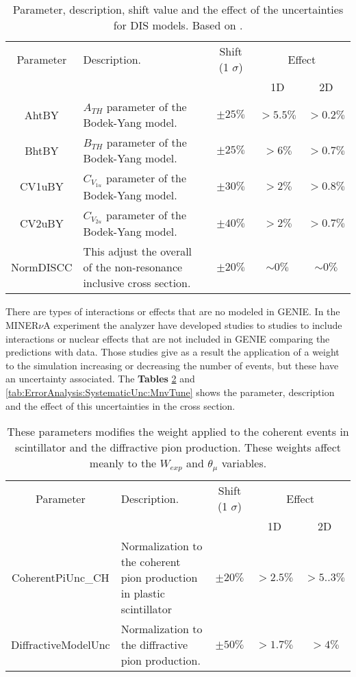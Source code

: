 \begin{table}[!htb]
    \centering
    \begin{tabular}{c|p{2.1in}|c|c|c}
        \hline 
        Parameter & Description.  & Shift (1 $\sigma$) & \multicolumn{2}{c}{Effect} \\
         & & & 1D & 2D \\
        \hline  
        AhtBY & $A_{TH}$ parameter of the Bodek-Yang model. & $\pm25\%$ & $>5.5\%$ & $>0.2\%$\\ \hline
        BhtBY & $B_{TH}$ parameter of the Bodek-Yang model. & $\pm25\%$ & $>6\%$ & $>0.7\%$ \\ \hline
        CV1uBY & $C_{V_{1u}}$ parameter of the Bodek-Yang model. & $\pm30\%$ & $>2\%$ & $>0.8\%$ \\ \hline
        CV2uBY & $C_{V_{2u}}$ parameter of the Bodek-Yang model. & $\pm40\%$ & $>2\%$ & $>0.7\%$ \\ \hline
        NormDISCC & This adjust the overall of the non-resonance inclusive cross section. & $\pm20\%$ & $\sim0\%$ & $\sim0\%$ \\ \hline 
    \end{tabular}
    \caption{Parameter, description, shift value and the effect of the uncertainties for DIS models. Based on \cite{GENIEUnc}.}
    \label{tab:ErrorAnalysis:SystematicUnc:GenieDISmodels}
\end{table}

There are types of interactions or effects that are no modeled in GENIE. In the MINER$\nu$A experiment the analyzer have developed studies to studies to include interactions or nuclear effects that are not included in GENIE comparing the predictions with data. Those studies give as a result the application of a weight to the simulation increasing or decreasing the number of events, but these have an uncertainty associated. The \textbf{Tables} \ref{tab:ErrorAnalysis:SystematicUnc:CoherentandDifractive} and \ref{tab:ErrorAnalysis:SystematicUnc:MnvTune} shows the parameter, description and the effect of this uncertainties in the cross section.

\begin{table}[!htb]
    \centering
    \begin{tabular}{c|p{2in}|c|c|c}
        \hline 
        Parameter & Description.  & Shift (1 $\sigma$) & \multicolumn{2}{c}{Effect} \\
         & & & 1D & 2D \\
        \hline  
        CoherentPiUnc\_CH & Normalization to the coherent pion production in plastic scintillator & $\pm20\%$ & $>2.5\%$ & $>5..3\%$\\ \hline
        DiffractiveModelUnc & Normalization to the diffractive pion production. & $\pm50\%$ & $>1.7\%$ & $>4\%$ \\ \hline 
    \end{tabular}
    \caption{These parameters modifies the weight applied to the coherent events in scintillator and the diffractive pion production. These weights affect meanly to the $W_{exp}$ and $\theta_\mu$ variables.}
    \label{tab:ErrorAnalysis:SystematicUnc:CoherentandDifractive}
\end{table}

